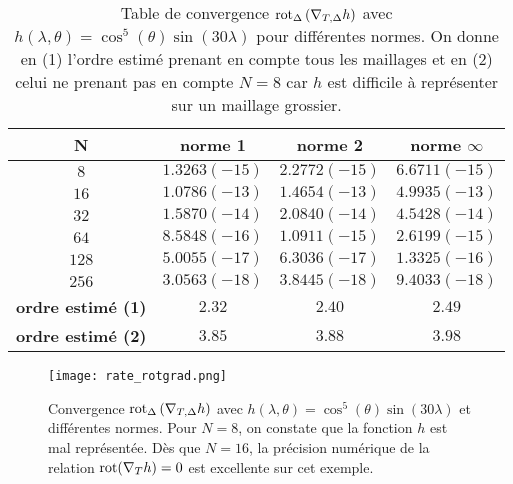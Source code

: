 \begin{table}[htbp]
\begin{center}
\begin{tabular}{|c||c|c|c|}
\hline
\textbf{N}  & \textbf{norme 1} & \textbf{norme 2} & \textbf{norme $\infty$} \\
\hline
\hline
$8$  & $1.3263(-15)$  & $2.2772(-15)$  & $6.6711(-15)$  \\
$16$ & $1.0786(-13)$  & $1.4654(-13)$  & $4.9935(-13)$  \\
$32$ & $1.5870(-14)$  & $2.0840(-14)$  & $4.5428(-14)$  \\
$64$ & $8.5848(-16)$  & $1.0911(-15)$  & $2.6199(-15)$  \\
$128$& $5.0055(-17)$  & $6.3036(-17)$  & $1.3325(-16)$  \\
$256$& $3.0563(-18)$  & $3.8445(-18)$  & $9.4033(-18)$ \\
\hline 
\hline
\textbf{ordre estimé (1)}& $2.32$ & $2.40$ & $2.49$\\
\hline
\hline
\textbf{ordre estimé (2)}& $3.85$ & $3.88$ & $3.98$\\
\hline
\end{tabular}
\end{center}
\caption{Table de convergence $\text{rot}_{\Delta} \left(\nabla_{T,\Delta} h \right)$ avec $ h(\lambda,\theta) = \cos^5 (\theta) \sin(30 \lambda)$ pour différentes normes. On donne en (1) l'ordre estimé prenant en compte tous les maillages et en (2) celui ne prenant pas en compte $N=8$ car $h$ est difficile à représenter sur un maillage grossier.}
\label{tab:rate_rotgrad}
\end{table} 
\begin{figure}[htbp]
\begin{center}
\texttt{[image: rate\_rotgrad.png]}
\end{center}
\caption{Convergence $\text{rot}_{\Delta} \left(\nabla_{T, \Delta} h \right)$ avec $ h(\lambda,\theta) = \cos^5 (\theta) \sin(30 \lambda)$ et différentes normes. Pour $N=8$, on constate que la fonction $h$ est mal représentée. Dès que $N=16$, la précision numérique de la relation $\text{rot}(\nabla_T h) = 0$ est excellente sur cet exemple.}
\label{fig:rate_rotgrad}
\end{figure}
















